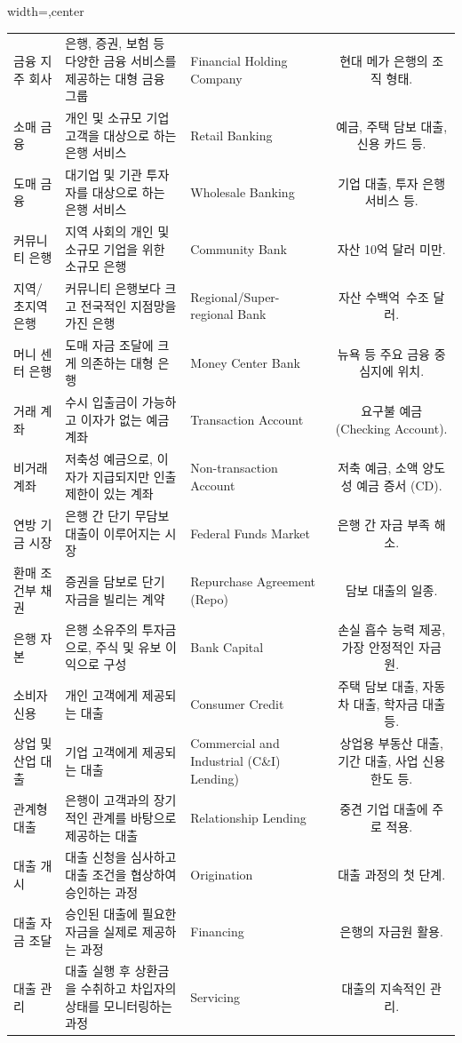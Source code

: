 \documentclass[11pt,a4paper]{article}
\begin{document}
\begin{adjustbox}{width=\textwidth,center}
\begin{tabular}{lllc}
금융 지주 회사 & 은행, 증권, 보험 등 다양한 금융 서비스를 제공하는 대형 금융 그룹 & Financial Holding Company & 현대 메가 은행의 조직 형태. \\
소매 금융 & 개인 및 소규모 기업 고객을 대상으로 하는 은행 서비스 & Retail Banking & 예금, 주택 담보 대출, 신용 카드 등. \\
도매 금융 & 대기업 및 기관 투자자를 대상으로 하는 은행 서비스 & Wholesale Banking & 기업 대출, 투자 은행 서비스 등. \\
커뮤니티 은행 & 지역 사회의 개인 및 소규모 기업을 위한 소규모 은행 & Community Bank & 자산 10억 달러 미만. \\
지역/초지역 은행 & 커뮤니티 은행보다 크고 전국적인 지점망을 가진 은행 & Regional/Super-regional Bank & 자산 수백억~수조 달러. \\
머니 센터 은행 & 도매 자금 조달에 크게 의존하는 대형 은행 & Money Center Bank & 뉴욕 등 주요 금융 중심지에 위치. \\
거래 계좌 & 수시 입출금이 가능하고 이자가 없는 예금 계좌 & Transaction Account & 요구불 예금 (Checking Account). \\
비거래 계좌 & 저축성 예금으로, 이자가 지급되지만 인출 제한이 있는 계좌 & Non-transaction Account & 저축 예금, 소액 양도성 예금 증서 (CD). \\
연방 기금 시장 & 은행 간 단기 무담보 대출이 이루어지는 시장 & Federal Funds Market & 은행 간 자금 부족 해소. \\
환매 조건부 채권 & 증권을 담보로 단기 자금을 빌리는 계약 & Repurchase Agreement (Repo) & 담보 대출의 일종. \\
은행 자본 & 은행 소유주의 투자금으로, 주식 및 유보 이익으로 구성 & Bank Capital & 손실 흡수 능력 제공, 가장 안정적인 자금원. \\
소비자 신용 & 개인 고객에게 제공되는 대출 & Consumer Credit & 주택 담보 대출, 자동차 대출, 학자금 대출 등. \\
상업 및 산업 대출 & 기업 고객에게 제공되는 대출 & Commercial and Industrial (C\&I) Lending) & 상업용 부동산 대출, 기간 대출, 사업 신용 한도 등. \\
관계형 대출 & 은행이 고객과의 장기적인 관계를 바탕으로 제공하는 대출 & Relationship Lending & 중견 기업 대출에 주로 적용. \\
대출 개시 & 대출 신청을 심사하고 대출 조건을 협상하여 승인하는 과정 & Origination & 대출 과정의 첫 단계. \\
대출 자금 조달 & 승인된 대출에 필요한 자금을 실제로 제공하는 과정 & Financing & 은행의 자금원 활용. \\
대출 관리 & 대출 실행 후 상환금을 수취하고 차입자의 상태를 모니터링하는 과정 & Servicing & 대출의 지속적인 관리. \\

\end{tabular}
\end{adjustbox}
\end{document}
